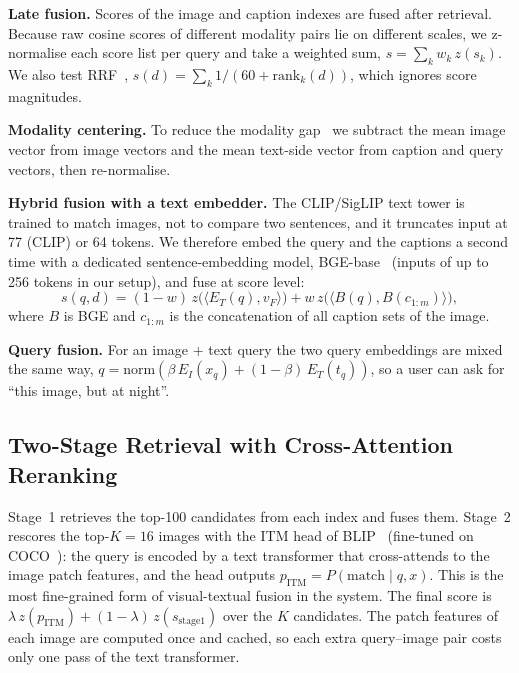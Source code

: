\documentclass[conference]{IEEEtran}
\begin{document}
\textbf{Late fusion.} Scores of the image and caption indexes are fused after retrieval. Because raw
cosine scores of different modality pairs lie on different scales, we z-normalise each score list per
query and take a weighted sum, $s = \sum_k w_k\, z(s_k)$. We also test RRF~\cite{cormack2009rrf},
$s(d)=\sum_k 1/(60 + \mathrm{rank}_k(d))$, which ignores score magnitudes.

\textbf{Modality centering.} To reduce the modality gap~\cite{liang2022gap} we subtract the mean image
vector from image vectors and the mean text-side vector from caption and query vectors, then
re-normalise.

\textbf{Hybrid fusion with a text embedder.} The CLIP/SigLIP text tower is trained to match images, not to
compare two sentences, and it truncates input at 77 (CLIP) or 64 tokens. We therefore embed the query and
the captions a second time with a dedicated sentence-embedding model, BGE-base~\cite{xiao2023bge}
(inputs of up to 256 tokens in our setup), and fuse at score level:
\begin{equation}
s(q,d) = (1-w)\, z\big(\langle E_T(q), v_F\rangle\big) + w\, z\big(\langle B(q), B(c_{1:m})\rangle\big),
\label{eq:hybrid}
\end{equation}
where $B$ is BGE and $c_{1:m}$ is the concatenation of all caption sets of the image.

\textbf{Query fusion.} For an image + text query the two query embeddings are mixed the same way,
$q = \mathrm{norm}(\beta\, E_I(x_q) + (1-\beta)\, E_T(t_q))$, so a user can ask for ``this image, but
at night''.

\subsection{Two-Stage Retrieval with Cross-Attention Reranking}
Stage~1 retrieves the top-100 candidates from each index and fuses them. Stage~2 rescores the top-$K=16$
images with the ITM head of BLIP~\cite{li2022blip} (fine-tuned on COCO~\cite{lin2014coco}): the query is
encoded by a text transformer that cross-attends to the image patch features, and the head outputs
$p_\mathrm{ITM} = P(\text{match}\mid q, x)$. This is the most fine-grained form of visual-textual
fusion in the system. The final score is
$\lambda\, z(p_\mathrm{ITM}) + (1-\lambda)\, z(s_\mathrm{stage1})$ over the $K$ candidates. The patch
features of each image are computed once and cached, so each extra query--image pair costs only one pass
of the text transformer.
\end{document}
